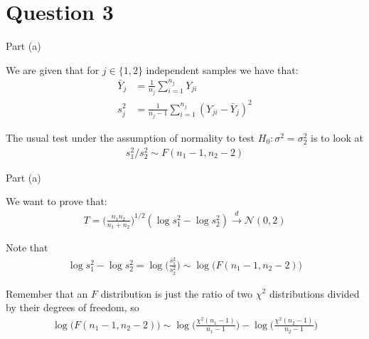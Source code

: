 \section{Question 3}

\begin{frame}{Part (a)}
    
    We are given that for $j \in \{1, 2\}$ independent samples we have that:
    \begin{align*}
        \bar{Y}_j &= \frac{1}{n_j} \sum_{i=1}^{n_j} Y_{ji}
        \\
        s^2_j &= \frac{1}{n_j - 1} \sum_{i=1}^{n_j} (Y_{ji} - \bar{Y}_j)^2
    \end{align*}

    The usual test under the assumption of normality to test $H_0: \sigma^2 = \sigma^2_2$ is to look at
    \begin{align*}
        s_1^2 / s_2^2 \sim F(n_1 - 1, n_2 - 2) 
    \end{align*}
    
\end{frame}

\begin{frame}{Part (a)}
    
    We want to prove that:
    \begin{align*}
        T = \Biggr( \frac{n_1 n_2}{n_1 + n_2} \Biggr)^{1/2} (\log s_1^2 - \log s_2^2) \xrightarrow{d} \mathcal{N}(0, 2)
    \end{align*}

    Note that
    \begin{align*}
        \log s_1^2 - \log s_2^2 = \log \Biggr( \frac{s_1^2}{s_2^2} \Biggr) \sim \log \Biggr( F(n_1 - 1, n_2 - 2) \Biggr)
    \end{align*}

    Remember that an $F$ distribution is just the ratio of two $\chi^2$ distributions divided by their degrees of freedom, so
    \begin{align*}
        \log \Biggr( F(n_1 - 1, n_2 - 2) \Biggr) \sim \log \Biggr( \frac{\chi^2(n_1 - 1)}{n_1 - 1} \Biggr) - \log \Biggr( \frac{\chi^2(n_2 - 1)}{n_2 - 1} \Biggr)
    \end{align*}
        
\end{frame}

